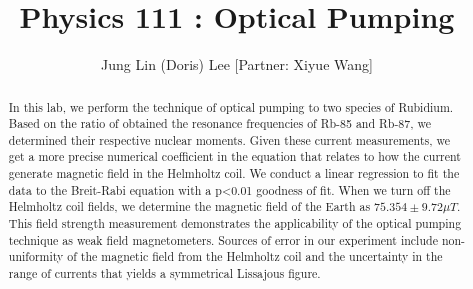 \documentclass{sigchi}
\def\plaintitle{Physics 111 : Optical Pumping}
\begin{document}
\title{\plaintitle}
\author{Jung Lin (Doris) Lee  [Partner: Xiyue Wang] }
\maketitle
\begin{abstract}
In this lab, we perform the technique of optical pumping to two species of Rubidium. Based on the ratio of obtained the resonance frequencies of Rb-85 and Rb-87, we determined their respective nuclear moments. Given these current measurements, we get a more precise numerical coefficient in the equation that relates to how the current generate magnetic field in the Helmholtz coil. We conduct a linear regression to fit the data to the Breit-Rabi equation with a p<0.01 goodness of fit. When we turn off the Helmholtz coil fields, we determine the magnetic field of the Earth as $75.354\pm 9.72 \mu T$. This field strength measurement demonstrates the applicability of the optical pumping technique as weak field magnetometers. Sources of error in our experiment include non-uniformity of the magnetic field from the Helmholtz coil and the uncertainty in the range of currents that yields a symmetrical Lissajous figure.
\end{abstract}
\end{document}
